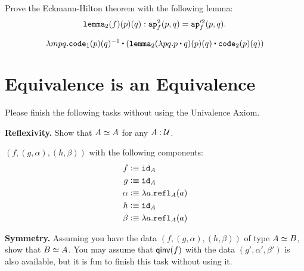 \documentclass[12pt]{article}
\newcommand{\cut}[1]{}
\newcommand{\marksolution}[1]{\color{FireBrick}#1\normalcolor}%
\newcommand{\marksolution}[1]{\cut{#1}}%
\newenvironment{solution}{\trivlist \item[\hskip \labelsep{\bf
Solution:}]}{\endtrivlist}
\begin{document}
\begin{task}
  Prove the Eckmann-Hilton theorem with the following lemma:
  \[
    \mathtt{lemma}_2(f)(p)(q) : \mathtt{ap}^2_f(p,q) = \mathtt{ap}'^2_f(p,q).
  \]
\end{task}
\marksolution{
  \begin{solution}
    \[
      \lambda mpq.\mathtt{code}_1(p)(q)^{-1} \concat (\lemmatwo(\lambda pq.p \concat q)(p)(q) \concat \mathtt{code}_2(p)(q))
    \]
  \end{solution}
}

\section{Equivalence is an Equivalence}

Please finish the following tasks without using the Univalence Axiom.

\begin{task}
  \textbf{Reflexivity.} Show that $A \simeq A$ for any $A : \mathcal{U}$.
\end{task}
\marksolution{
  \begin{solution}
    $(f,(g,\alpha),(h,\beta))$ with the following components:
    \begin{align*}
      f &\vcentcolon\equiv \mathtt{id}_A
      \\
      g &\vcentcolon\equiv \mathtt{id}_A
      \\
      \alpha &\vcentcolon\equiv \lambda a.\mathtt{refl}_A(a)
      \\
      h &\vcentcolon\equiv \mathtt{id}_A
      \\
      \beta &\vcentcolon\equiv \lambda a.\mathtt{refl}_A(a)
    \end{align*}
  \end{solution}
}

\begin{task}
  \textbf{Symmetry.}
  Assuming you have the data $(f,(g,\alpha),(h,\beta))$ of type $A \simeq B$, show that $B \simeq A$.
  You may assume that $\mathsf{qinv}(f)$ with the data $(g',\alpha',\beta')$ is also available,
  but it is fun to finish this task without using it.
\end{task}
\end{document}
